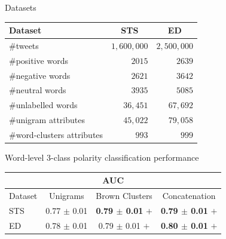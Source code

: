 \documentclass[handout]{beamer}
\begin{document}
\begin{frame}{Datasets}


\begin{table}[htbp]
\scriptsize
\begin{center}
\begin{tabular}{ l|r|r}
\hline \hline
Dataset & \multicolumn{1}{c|}{STS} & \multicolumn{1}{c}{ED} \\ \hline 
\#tweets & $1,600,000$ & $2,500,000$ \\ 
\#positive words & $2015$ & $2639$ \\ 
\#negative words & $2621$ & $3642$ \\ 
\#neutral words & $3935$ & $5085$ \\ 
\#unlabelled words & $36,451$ & $67,692$ \\ 
\#unigram attributes & $45,022$ & $79,058$ \\ 
\#word-clusters attributes & $993$ & $999$ \\ \hline \hline
\end{tabular}
\end{center}
\label{tab:corpstats}
\end{table}
\end{frame}

\begin{frame}{Word-level 3-class polarity classification performance}
\begin{scriptsize}
\begin{table}[!htb]
\scriptsize
\begin{center}
\begin{tabular}{l|c|c|c}
\hline \hline
\multicolumn{ 4}{c}{AUC} \\ \hline \hline
Dataset & Unigrams & Brown Clusters & Concatenation \\ \hline
STS & 0.77 $\pm$ 0.01 & \textbf{0.79 $\pm$ 0.01} $+$ & \textbf{0.79 $\pm$ 0.01} $+$ \\ 
ED  & 0.78 $\pm$ 0.01 & 0.79 $\pm$ 0.01 $+$ & \textbf{0.80 $\pm$ 0.01} $+$ \\ 
\hline
\end{tabular}
\end{center}
\end{table}
\end{scriptsize}
\end{frame}
\end{document}
